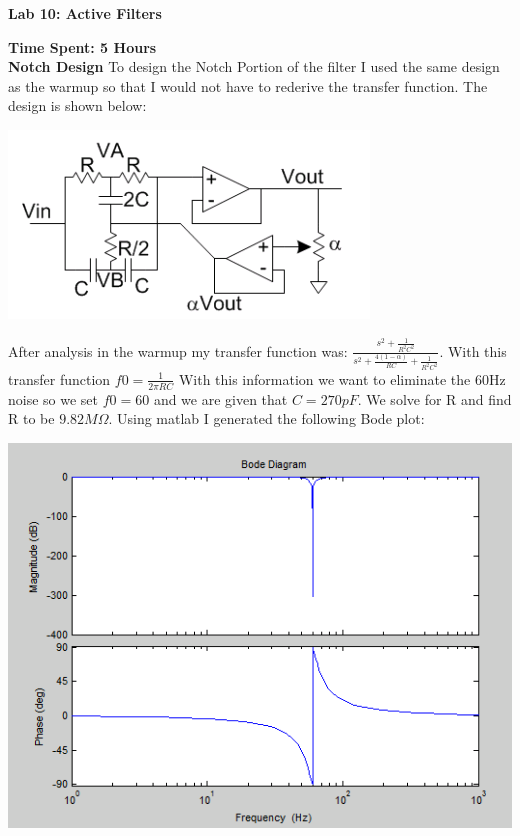 \documentclass[12pt,letterpaper,boxed]{hmcpset}
\begin{document}
\begin{center}
\textbf{Lab 10: Active Filters}
\end{center}
\textbf{Time Spent: 5 Hours}\\
\textbf{Notch Design}
To design the Notch Portion of the filter I used the same design as the warmup so that I would not have to rederive the transfer function. The design is shown below:
\begin{center}
\includegraphics[scale=1]{Notch}
\end{center}
After analysis in the warmup my transfer function was: $\frac{s^2 + \frac{1}{R^2C^2}}{s^2 +\frac{4(1-\alpha)}{RC} + \frac{1}{R^2C^2}}$. With this transfer function $f0=\frac{1}{2\pi RC}$ With this information we want to eliminate the 60Hz noise so we set $f0=60$ and we are given that $C=270pF$. We solve for R and find R to be $9.82M\Omega$. Using matlab I generated the following Bode plot:
\begin{center}
\includegraphics[scale=.75]{Notchmatlab}
\end{center}
\end{document}
